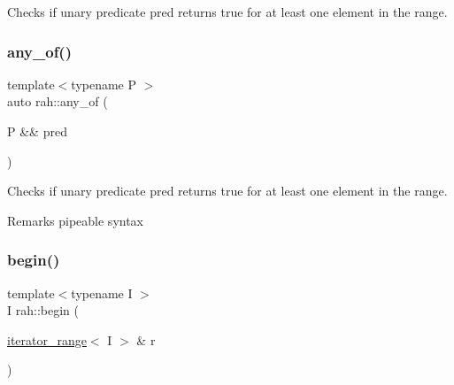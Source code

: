 Checks if unary predicate pred returns true for at least one element in the range. 


\begin{DoxyCodeInclude}{0}
\DoxyCodeLine{    );}
\end{DoxyCodeInclude}
\mbox{\label{namespacerah_aa3f330b2354859d8a9e6df794a1e7a1a}} 
\subsubsection{\texorpdfstring{any\_of()}{any\_of()}\hspace{0.1cm}{\footnotesize\ttfamily [2/2]}}
{\footnotesize\ttfamily template$<$typename P $>$ \\
auto rah\+::any\+\_\+of (\begin{DoxyParamCaption}\item[{P \&\&}]{pred }\end{DoxyParamCaption})}



Checks if unary predicate pred returns true for at least one element in the range. 

\begin{DoxyRemark}{Remarks}
pipeable syntax
\end{DoxyRemark}

\begin{DoxyCodeInclude}{0}
\DoxyCodeLine{    ));}
\end{DoxyCodeInclude}
\mbox{\label{namespacerah_a2c4a19e57cc4e0753e93830f247def6d}} 
\subsubsection{\texorpdfstring{begin()}{begin()}\hspace{0.1cm}{\footnotesize\ttfamily [1/2]}}
{\footnotesize\ttfamily template$<$typename I $>$ \\
I rah\+::begin (\begin{DoxyParamCaption}\item[{\mbox{\hyperlink{structrah_1_1iterator__range}{iterator\+\_\+range}}$<$ I $>$ \&}]{r }\end{DoxyParamCaption})}

